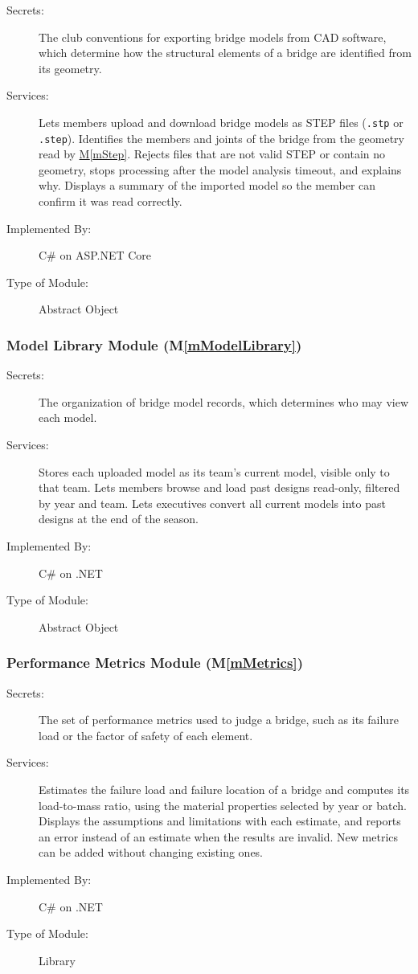 \documentclass[12pt, titlepage]{article}
\newcommand{\mref}[1]{\hyperref[#1:dec]{M\ref*{#1}}}
\begin{document}
\begin{description}
\item[Secrets:] The club conventions for exporting bridge models from CAD software, which determine how the structural elements of a bridge are identified from its geometry.
\item[Services:] Lets members upload and download bridge models as STEP files
  (\texttt{.stp} or \texttt{.step}). Identifies the members and joints of the
  bridge from the geometry read by \mref{mStep}. Rejects files that are not valid
  STEP or contain no geometry, stops processing after the model analysis
  timeout, and explains why. Displays a summary of the imported model so the
  member can confirm it was read correctly.
\item[Implemented By:] C\# on ASP.NET Core
\item[Type of Module:] Abstract Object
\end{description}

\subsubsection{Model Library Module (M\ref*{mModelLibrary})}\label{mModelLibrary:dec}

\begin{description}
\item[Secrets:] The organization of bridge model records, which determines who may view each model.
\item[Services:] Stores each uploaded model as its team's current model, visible
  only to that team. Lets members browse and load past designs read-only,
  filtered by year and team. Lets executives convert all current models into past
  designs at the end of the season.
\item[Implemented By:] C\# on .NET
\item[Type of Module:] Abstract Object
\end{description}

\subsubsection{Performance Metrics Module (M\ref*{mMetrics})}\label{mMetrics:dec}

\begin{description}
\item[Secrets:] The set of performance metrics used to judge a bridge, such as its failure load or the factor of safety of each element.
\item[Services:] Estimates the failure load and failure location of a bridge and
  computes its load-to-mass ratio, using the material properties selected by
  year or batch. Displays the assumptions and limitations with each estimate,
  and reports an error instead of an estimate when the results are invalid.
  New metrics can be added without changing existing ones.
\item[Implemented By:] C\# on .NET
\item[Type of Module:] Library
\end{description}
\end{document}
